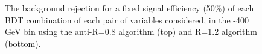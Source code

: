 \begin{figure}
\begin{center}
\caption{
The background rejection
for a fixed signal efficiency (50\%) of each BDT combination of
each pair of variables considered, in the -400 GeV bin using the anti-\kT R=0.8
algorithm (top) and R=1.2 algorithm (bottom).
}
\label{fig:pt300_comb2D}
\end{center}
\end{figure}


